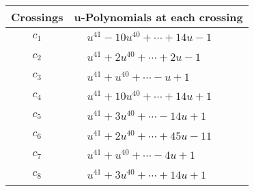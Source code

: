 \documentclass[1p]{elsarticle_modified}
\theoremstyle{definition}
\begin{document}
\begin{tabular}{m{50pt}|m{274pt}}
Crossings & \hspace{64pt}u-Polynomials at each crossing \\
\hline $$\begin{aligned}c_{1}\end{aligned}$$&$\begin{aligned}
&u^{41}-10 u^{40}+\cdots+14 u-1
\end{aligned}$\\
\hline $$\begin{aligned}c_{2}\end{aligned}$$&$\begin{aligned}
&u^{41}+2 u^{40}+\cdots+2 u-1
\end{aligned}$\\
\hline $$\begin{aligned}c_{3}\end{aligned}$$&$\begin{aligned}
&u^{41}+u^{40}+\cdots- u+1
\end{aligned}$\\
\hline $$\begin{aligned}c_{4}\end{aligned}$$&$\begin{aligned}
&u^{41}+10 u^{40}+\cdots+14 u+1
\end{aligned}$\\
\hline $$\begin{aligned}c_{5}\end{aligned}$$&$\begin{aligned}
&u^{41}+3 u^{40}+\cdots-14 u+1
\end{aligned}$\\
\hline $$\begin{aligned}c_{6}\end{aligned}$$&$\begin{aligned}
&u^{41}+2 u^{40}+\cdots+45 u-11
\end{aligned}$\\
\hline $$\begin{aligned}c_{7}\end{aligned}$$&$\begin{aligned}
&u^{41}+u^{40}+\cdots-4 u+1
\end{aligned}$\\
\hline $$\begin{aligned}c_{8}\end{aligned}$$&$\begin{aligned}
&u^{41}+3 u^{40}+\cdots+14 u+1
\end{aligned}$\\

\end{tabular}
\end{document}
